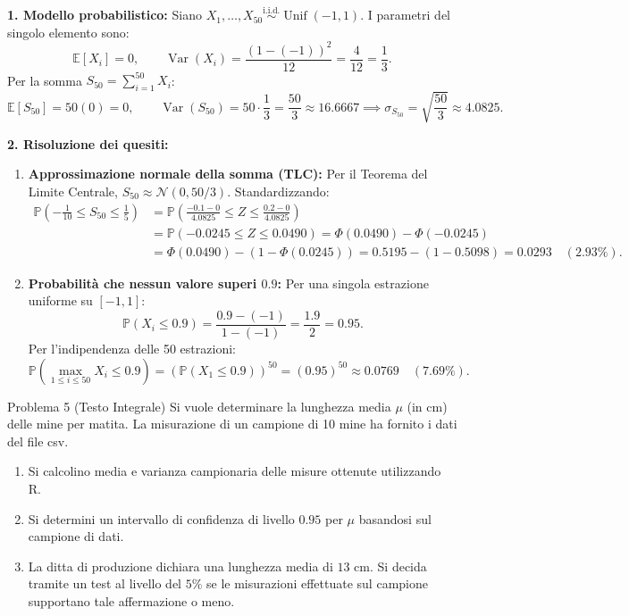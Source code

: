 \documentclass[11pt,a4paper]{article}
\newcommand{\EE}{\mathbb{E}}
\newcommand{\Prob}{\mathbb{P}}
\newcommand{\Var}{\operatorname{Var}}
\begin{document}
\begin{soluzionebox}
\textbf{1. Modello probabilistico:}
Siano $X_1, \dots, X_{50} \overset{\text{i.i.d.}}{\sim} \operatorname{Unif}(-1, 1)$.
I parametri del singolo elemento sono:
\[
\EE[X_i] = 0, \qquad \Var(X_i) = \frac{(1 - (-1))^2}{12} = \frac{4}{12} = \frac{1}{3}.
\]
Per la somma $S_{50} = \sum_{i=1}^{50} X_i$:
\[
\EE[S_{50}] = 50(0) = 0, \qquad \Var(S_{50}) = 50 \cdot \frac{1}{3} = \frac{50}{3} \approx 16.6667 \implies \sigma_{S_{50}} = \sqrt{\frac{50}{3}} \approx 4.0825.
\]

\textbf{2. Risoluzione dei quesiti:}
\begin{enumerate}[label=(\roman*)]
    \item \textbf{Approssimazione normale della somma (TLC):}
    Per il Teorema del Limite Centrale, $S_{50} \approx \mathcal{N}(0, 50/3)$. Standardizzando:
    \begin{align*}
    \Prob\left(-\frac{1}{10} \le S_{50} \le \frac{1}{5}\right) &= \Prob\left(\frac{-0.1 - 0}{4.0825} \le Z \le \frac{0.2 - 0}{4.0825}\right) \\
    &= \Prob(-0.0245 \le Z \le 0.0490) = \Phi(0.0490) - \Phi(-0.0245) \\
    &= \Phi(0.0490) - (1 - \Phi(0.0245)) = 0.5195 - (1 - 0.5098) = \bm{0.0293} \quad (\bm{2.93\%}).
    \end{align*}

    \item \textbf{Probabilità che nessun valore superi $0.9$:}
    Per una singola estrazione uniforme su $[-1, 1]$:
    \[
    \Prob(X_i \le 0.9) = \frac{0.9 - (-1)}{1 - (-1)} = \frac{1.9}{2} = 0.95.
    \]
    Per l'indipendenza delle 50 estrazioni:
    \[
    \Prob\left(\max_{1 \le i \le 50} X_i \le 0.9\right) = \left( \Prob(X_1 \le 0.9) \right)^{50} = (0.95)^{50} \approx \bm{0.0769} \quad (\bm{7.69\%}).
    \]
\end{enumerate}
\end{soluzionebox}

\begin{problemabox}{Problema 5 (Testo Integrale)}
Si vuole determinare la lunghezza media $\mu$ (in cm) delle mine per matita. La misurazione di un campione di 10 mine ha fornito i dati del file csv.
\begin{enumerate}[label=(\roman*)]
    \item Si calcolino media e varianza campionaria delle misure ottenute utilizzando R.
    \item Si determini un intervallo di confidenza di livello $0.95$ per $\mu$ basandosi sul campione di dati.
    \item La ditta di produzione dichiara una lunghezza media di $13\text{ cm}$. Si decida tramite un test al livello del $5\%$ se le misurazioni effettuate sul campione supportano tale affermazione o meno.
\end{enumerate}
\end{problemabox}
\end{document}
